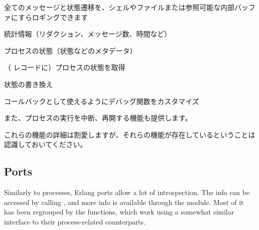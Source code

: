 \begin{itemize*}
	\item 全てのメッセージと状態遷移を、シェルやファイルまたは参照可能な内部バッファにすらロギングできます
	\item 統計情報（リダクション、メッセージ数、時間など）
	\item プロセスの状態（状態などのメタデータ）
	\item （ レコードに）プロセスの状態を取得
	\item 状態の書き換え
	\item コールバックとして使えるようにデバッグ関数をカスタマイズ
\end{itemize*}

また、プロセスの実行を中断、再開する機能も提供します。

これらの機能の詳細は割愛しますが、それらの機能が存在しているということは認識しておいてください。

\subsection{Ports}

Similarly to processes, Erlang ports allow a lot of introspection. The info can be accessed by calling , and more info is available through the  module. Most of it has been regrouped by the  functions, which work using a somewhat similar interface to their process-related counterparts. 

